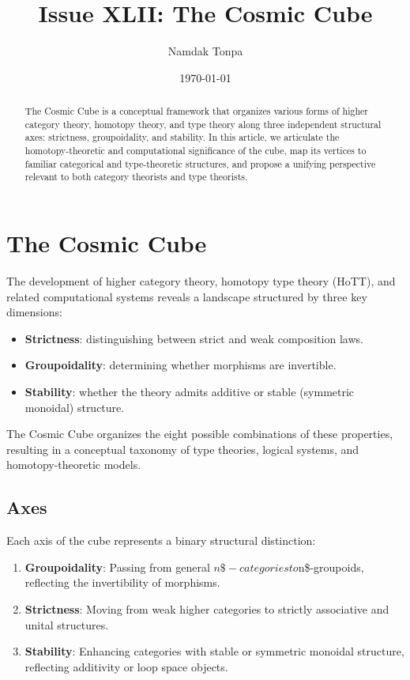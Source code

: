 \documentclass{article}
\begin{document}
\title{Issue XLII: The Cosmic Cube}
\author{Namdak Tonpa}
\date{\today}

\maketitle

\begin{abstract}
The Cosmic Cube is a conceptual framework that organizes various forms of higher category theory, homotopy theory, and type theory along three independent structural axes: strictness, groupoidality, and stability. In this article, we articulate the homotopy-theoretic and computational significance of the cube, map its vertices to familiar categorical and type-theoretic structures, and propose a unifying perspective relevant to both category theorists and type theorists.
\end{abstract}

\ifincludeTOC
  \tableofcontents
\fi

\section{The Cosmic Cube}
The development of higher category theory, homotopy type theory (HoTT), and related computational systems reveals a landscape structured by three key dimensions:

\begin{itemize}
\item \textbf{Strictness}: distinguishing between strict and weak composition laws.
\item \textbf{Groupoidality}: determining whether morphisms are invertible.
\item \textbf{Stability}: whether the theory admits additive or stable (symmetric monoidal) structure.
\end{itemize}

The Cosmic Cube organizes the eight possible combinations of these properties, resulting in a conceptual taxonomy of type theories, logical systems, and homotopy-theoretic models.

\subsection{Axes}

Each axis of the cube represents a binary structural distinction:

\begin{enumerate}
\item \textbf{Groupoidality}: Passing from general $n\$-categories to $n\$-groupoids, reflecting the invertibility of morphisms.
\item \textbf{Strictness}: Moving from weak higher categories to strictly associative and unital structures.
\item \textbf{Stability}: Enhancing categories with stable or symmetric monoidal structure, reflecting additivity or loop space objects.
\end{enumerate}
\end{document}
